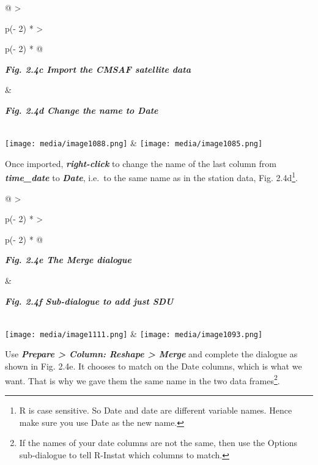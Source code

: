 \documentclass[
  letterpaper,
  DIV=11,
  numbers=noendperiod]{scrreprt}
\begin{document}
\begin{longtable}[]{@{}
  >{\raggedright\arraybackslash}p{(\columnwidth - 2\tabcolsep) * }
  >{\raggedright\arraybackslash}p{(\columnwidth - 2\tabcolsep) * }@{}}
\toprule\noalign{}
\begin{minipage}[b]{\linewidth}\raggedright
\textbf{\emph{Fig. 2.4c Import the CMSAF satellite data}}
\end{minipage} & \begin{minipage}[b]{\linewidth}\raggedright
\textbf{\emph{Fig. 2.4d Change the name to Date}}
\end{minipage} \\
\midrule\noalign{}
\endhead
\bottomrule\noalign{}
\endlastfoot
\texttt{[image: media/image1088.png]}
&
\texttt{[image: media/image1085.png]} \\
\end{longtable}

Once imported, \textbf{\emph{right-click}} to change the name of the
last column from \textbf{\emph{time\_date}} to \textbf{\emph{Date}},
i.e.~to the same name as in the station data, Fig. 2.4d\footnote{R is
  case sensitive. So Date and date are different variable names. Hence
  make sure you use Date as the new name.}.

\begin{longtable}[]{@{}
  >{\raggedright\arraybackslash}p{(\columnwidth - 2\tabcolsep) * }
  >{\raggedright\arraybackslash}p{(\columnwidth - 2\tabcolsep) * }@{}}
\toprule\noalign{}
\begin{minipage}[b]{\linewidth}\raggedright
\textbf{\emph{Fig. 2.4e The Merge dialogue}}
\end{minipage} & \begin{minipage}[b]{\linewidth}\raggedright
\textbf{\emph{Fig. 2.4f Sub-dialogue to add just SDU}}
\end{minipage} \\
\midrule\noalign{}
\endhead
\bottomrule\noalign{}
\endlastfoot
\texttt{[image: media/image1111.png]}
&
\texttt{[image: media/image1093.png]} \\
\end{longtable}

Use \textbf{\emph{Prepare \textgreater{} Column: Reshape \textgreater{}
Merge}} and complete the dialogue as shown in Fig. 2.4e. It chooses to
match on the Date columns, which is what we want. That is why we gave
them the same name in the two data frames\footnote{If the names of your
  date columns are not the same, then use the Options sub-dialogue to
  tell R-Instat which columns to match.}.
\end{document}
